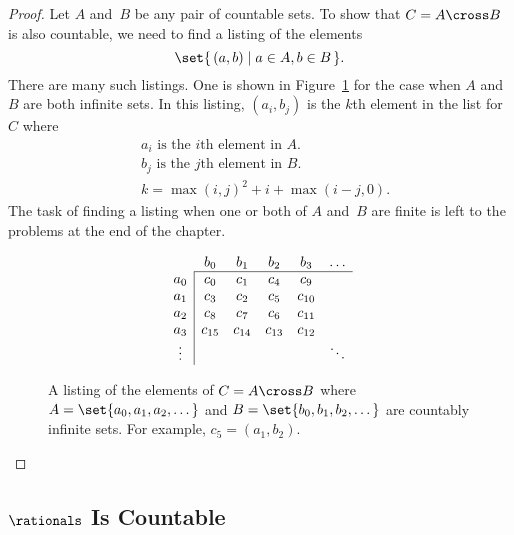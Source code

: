 \begin{proof}
Let $A$ and~$B$ be any pair of countable sets.  To show that $C = A
\cross B$ is also countable, we need to find a listing of the elements
\begin{equation*}
    \set{\, (a, b) \mid a \in A, b \in B \,}.
\end{equation*}
There are many such listings.  One is shown in Figure~\ref{fig:13D6}
for the case when $A$ and~$B$ are both infinite sets.  In this
listing, $(a_i, b_j)$ is the $k$th element in the list for~$C$ where
\begin{align*}
    & \text{$a_i$ is the $i$th element in~$A$.} \\
    & \text{$b_j$ is the $j$th element in~$B$.} \\
    & k = \max(i,j)^2 + i + \max(i - j, 0).
\end{align*}
The task of finding a listing when one or both of $A$ and~$B$ are
finite is left to the problems at the end of the chapter.

\begin{figure}

\begin{equation*}
\begin{array}{c|ccccc}
\multicolumn{1}{c}{} & b_0    & b_1       & b_2       & b_3    & \dots \\
\cline{2-6}
a_0    & c_0    & c_1       & c_4       & c_9    \\
a_1    & c_3    & c_2       & c_5       & c_{10} \\
a_2    & c_8    & c_7       & c_6       & c_{11} \\
a_3    & c_{15} & c_{14}    & c_{13}    & c_{12} \\
\vdots &        &           &           &       & \ddots
\end{array}
\end{equation*}

\caption{A listing of the elements of $C = A \cross B$ where $A =
  \set{a_0, a_1, a_2, \dots}$ and $B = \set{b_0, b_1, b_2, \dots}$ are
  countably infinite sets.  For example, $c_5 = (a_1, b_2)$.}

\label{fig:13D6}

\end{figure}

\end{proof}

\subsection{$\rationals$ Is Countable}

